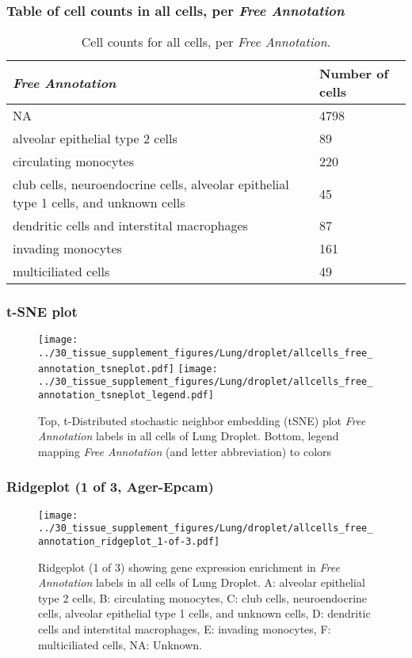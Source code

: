 \subsubsection{Table of cell counts in all cells, per \emph{Free Annotation}}\begin{table}[h]
\centering
\label{my-label}
\begin{tabular}{@{}ll@{}}
\toprule

\emph{Free Annotation}& Number of cells \\ \midrule
NA & 4798 \\

alveolar epithelial type 2 cells & 89 \\

circulating monocytes & 220 \\

club cells, neuroendocrine cells, alveolar epithelial type 1 cells, and unknown cells & 45 \\

dendritic cells and interstital macrophages & 87 \\

invading monocytes & 161 \\

multiciliated cells & 49 \\
\bottomrule
\end{tabular}
\caption{Cell counts for all cells, per \emph{Free Annotation}.}
\end{table}

\clearpage
\subsubsection{t-SNE plot}
\begin{figure}[h]
\centering
\texttt{[image: ../30\_tissue\_supplement\_figures/Lung/droplet/allcells\_free\_annotation\_tsneplot.pdf]}
\texttt{[image: ../30\_tissue\_supplement\_figures/Lung/droplet/allcells\_free\_annotation\_tsneplot\_legend.pdf]}
\caption{Top, t-Distributed stochastic neighbor embedding (tSNE) plot  \emph{Free Annotation} labels in all cells of Lung Droplet. Bottom, legend mapping \emph{Free Annotation} (and letter abbreviation) to colors}
\end{figure}


\clearpage

\subsubsection{Ridgeplot (1 of 3, Ager-Epcam)}
\begin{figure}[h]
\centering
\texttt{[image: ../30\_tissue\_supplement\_figures/Lung/droplet/allcells\_free\_annotation\_ridgeplot\_1-of-3.pdf]}

\caption{ Ridgeplot (1 of 3)  showing gene expression enrichment in \emph{Free Annotation} labels in all cells of Lung Droplet. A: alveolar epithelial type 2 cells, B: circulating monocytes, C: club cells, neuroendocrine cells, alveolar epithelial type 1 cells, and unknown cells, D: dendritic cells and interstital macrophages, E: invading monocytes, F: multiciliated cells, NA: Unknown.}
\end{figure}


